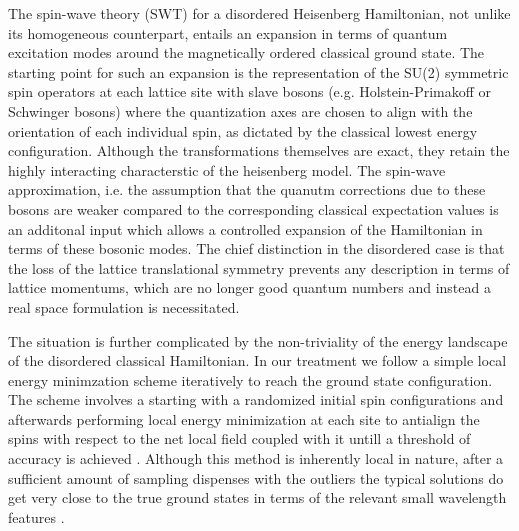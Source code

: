 \documentclass[aps,prb,twocolumn,showpacs]{revtex4-1}
\begin{document}
The spin-wave theory (SWT) for a disordered Heisenberg Hamiltonian, not unlike its 
homogeneous counterpart, entails an expansion in terms of quantum excitation modes 
around the magnetically ordered classical ground state\cite{Wessel-quasicrystal-2005,
Andrade-disordered-spin-glass-2012}. The starting point for such an expansion is the
representation of the SU(2) symmetric spin operators at each lattice site with 
slave bosons (e.g. Holstein-Primakoff or Schwinger bosons) where the quantization axes 
are chosen to align with the orientation of each individual spin, as dictated by the 
classical lowest energy configuration\cite{Anderson-SWT-52,*Kubo-SWT-52}. Although the 
transformations themselves are exact, they retain the highly interacting characterstic
of the heisenberg model. The spin-wave approximation, i.e. the assumption that the 
quanutm corrections due to these bosons are weaker compared to the corresponding 
classical expectation values is an additonal input which allows a controlled expansion 
of the Hamiltonian in terms of these bosonic modes. The chief distinction in the 
disordered case is that the loss of the lattice translational symmetry prevents any 
description in terms of lattice momentums, which are no longer good quantum numbers
and instead a real space formulation is necessitated.

The situation is further complicated by the non-triviality of the energy landscape of 
the disordered classical Hamiltonian. In our treatment we follow a simple local 
energy minimzation scheme iteratively to reach the ground state configuration. The 
scheme involves a starting with a randomized initial spin configurations and afterwards
performing local energy minimization at each site to antialign the spins with respect to
the net local field coupled with it untill a threshold of accuracy is achieved
\cite{Walker-spin-glass-iterative-1977,Henley-spin-glass-interative-1984}. Although this
method is inherently local in nature, after a sufficient 
amount of sampling dispenses with the outliers the typical solutions do get very close to 
the true ground states in terms of the relevant small wavelength features
\cite{Henley-spin-glass-interative-1984,Sklan-spin-glass-iterative-2013}.
\end{document}
